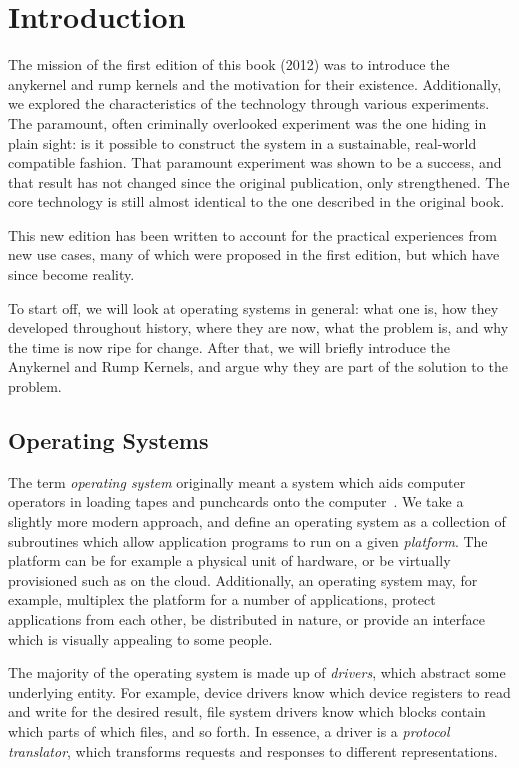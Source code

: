 
\section{Introduction}
\label{chap:introduction}

The mission of the first edition of this book (2012) was to introduce
the anykernel and rump kernels and the motivation for their existence.  Additionally, we explored
the characteristics of the technology through various experiments.
The paramount, often criminally overlooked experiment was the one hiding in
plain sight: is it possible to construct the system in a sustainable,
real-world compatible fashion.  That paramount experiment was shown
to be a success, and that result has not changed since the original
publication, only strengthened.  The core technology is still almost
identical to the one described in the original book.

This new edition has been written to account for the practical experiences
from new use cases, many of which were proposed in the first edition,
but which have since become reality.

To start off, we will look at operating systems in general: what one is,
how they developed throughout history, where they are now, what the
problem is, and why the time is now ripe for change.  After that, we
will briefly introduce the Anykernel and Rump Kernels, and argue why
they are part of the solution to the problem.


\subsection{Operating Systems}

The term \textit{operating system} originally meant a system which aids
computer operators in loading tapes and punchcards onto the
computer~\cite{dijkstra:ewd1303}.  We take a slightly more modern
approach, and define an operating system as a collection
of subroutines which allow application programs to run on a given
\textit{platform}.  The platform can be for example a physical unit of
hardware, or be virtually provisioned such as on the cloud.  Additionally,
an operating system may, for example, multiplex the platform for a number
of applications, protect applications from each other, be distributed
in nature, or provide an interface which is visually appealing to
some people.

The majority of the operating system is made up of \textit{drivers},
which abstract some underlying entity.  For example, device drivers
know which device registers to read and write for the desired result,
file system drivers know which blocks contain which parts of which files,
and so forth.  In essence, a driver is a \textit{protocol translator},
which transforms requests and responses to different representations.

